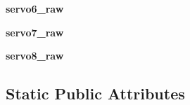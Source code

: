 \begin{DoxyCompactItemize}
{\bfseries servo6\+\_\+raw}
\item 
\mbox{\label{classpymavlink_1_1dialects_1_1v10_1_1MAVLink__servo__output__raw__message_ae76dcc903d08ad3cfdf9a83273777b71}} 
{\bfseries servo7\+\_\+raw}
\item 
\mbox{\label{classpymavlink_1_1dialects_1_1v10_1_1MAVLink__servo__output__raw__message_a71cc1e3f6a8e251d847c6142a9935062}} 
{\bfseries servo8\+\_\+raw}
\end{DoxyCompactItemize}
\subsection*{Static Public Attributes}

